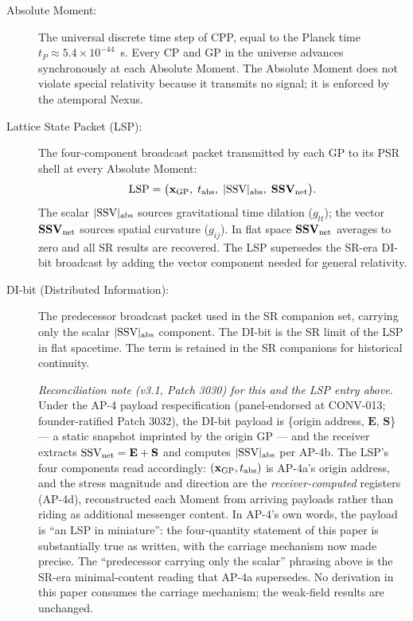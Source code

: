 \documentclass[12pt]{article}
\newcommand{\SSV}{\text{SSV}}
\newcommand{\LSP}{\text{LSP}}
\begin{document}
\begin{description}
\item[Absolute Moment:] The universal discrete time step of CPP,
  equal to the Planck time $t_P \approx 5.4 \times 10^{-44}$~s.
  Every CP and GP in the universe advances synchronously at each
  Absolute Moment. The Absolute Moment does not violate special
  relativity because it transmits no signal; it is enforced by the
  atemporal Nexus.

\item[Lattice State Packet (LSP):] The four-component broadcast
  packet transmitted by each GP to its PSR shell at every Absolute
  Moment:
  \[
    \LSP = \bigl(\mathbf{x}_{\rm GP},\; t_{\rm abs},\;
    |\SSV|_{\rm abs},\; \mathbf{SSV}_{\rm net}\bigr).
  \]
  The scalar $|\SSV|_{\rm abs}$ sources gravitational time dilation
  ($g_{tt}$); the vector $\mathbf{SSV}_{\rm net}$ sources spatial
  curvature ($g_{ij}$). In flat space $\mathbf{SSV}_{\rm net}$
  averages to zero and all SR results are recovered. The LSP
  supersedes the SR-era DI-bit broadcast by adding the vector
  component needed for general relativity.

\item[DI-bit (Distributed Information):] The predecessor broadcast
  packet used in the SR companion set, carrying only the scalar
  $|\SSV|_{\rm abs}$ component. The DI-bit is the SR limit of the
  LSP in flat spacetime. The term is retained in the SR companions
  for historical continuity.

  \emph{Reconciliation note (v3.1, Patch 3030) for this and the LSP
  entry above.} Under the AP-4 payload respecification (panel-endorsed
  at CONV-013; founder-ratified Patch 3032), the DI-bit
  payload is \{origin address, $\mathbf{E}$, $\mathbf{S}$\} — a static
  snapshot imprinted by the origin GP — and the receiver extracts
  $\SSV_{\rm net} = \mathbf{E}+\mathbf{S}$ and computes
  $|\SSV|_{\rm abs}$ per AP-4b. The LSP's four components read
  accordingly: $(\mathbf{x}_{\rm GP}, t_{\rm abs})$ is AP-4a's origin
  address, and the stress magnitude and direction are the
  \emph{receiver-computed} registers (AP-4d), reconstructed each Moment
  from arriving payloads rather than riding as additional messenger
  content. In AP-4's own words, the payload is ``an LSP in miniature'':
  the four-quantity statement of this paper is substantially true as
  written, with the carriage mechanism now made precise. The
  ``predecessor carrying only the scalar'' phrasing above is the SR-era
  minimal-content reading that AP-4a supersedes. No derivation in this
  paper consumes the carriage mechanism; the weak-field results are
  unchanged.


\end{description}
\end{document}
